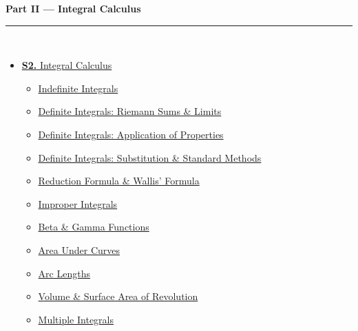 \documentclass[12pt,a3paper]{article}
\begin{document}
\begin{tcolorbox}[breakable,colback=cB!5,colframe=cB,boxrule=1pt,arc=5pt,
  left=8pt,right=8pt,top=8pt,bottom=8pt,before skip=4pt]
  {\large\bfseries\textcolor{cB}{Part II --- Integral Calculus}}\\[5pt]
  \textcolor{cB!40}{\rule{\textwidth}{0.4pt}}\\[3pt]
  \small\begin{itemize}[leftmargin=1.2em,itemsep=1pt,label={\textcolor{cB}{$\triangleright$}}]
    \item \hyperref[sec:S2]{\textbf{S2.} Integral Calculus}
      \begin{itemize}[leftmargin=1.5em,itemsep=0pt,label={\textcolor{cB}{$\cdot$}}]
        \item \hyperref[sub:s2-indefinite]{Indefinite Integrals}
        \item \hyperref[sub:s2-definite-riemann]{Definite Integrals: Riemann Sums \& Limits}
        \item \hyperref[sub:s2-definite-properties]{Definite Integrals: Application of Properties}
        \item \hyperref[sub:s2-definite-standard]{Definite Integrals: Substitution \& Standard Methods}
        \item \hyperref[sub:s2-rwallis]{Reduction Formula \& Wallis' Formula}
        \item \hyperref[sub:s2-improper]{Improper Integrals}
        \item \hyperref[sub:s2-beta]{Beta \& Gamma Functions}
        \item \hyperref[sub:s2-area]{Area Under Curves}
        \item \hyperref[sub:s2-arclength]{Arc Lengths}
        \item \hyperref[sub:s2-volume]{Volume \& Surface Area of Revolution}
        \item \hyperref[sub:s2-multiple]{Multiple Integrals}
      \end{itemize}
  \end{itemize}
\end{tcolorbox}

\vspace{6pt}
\end{document}

